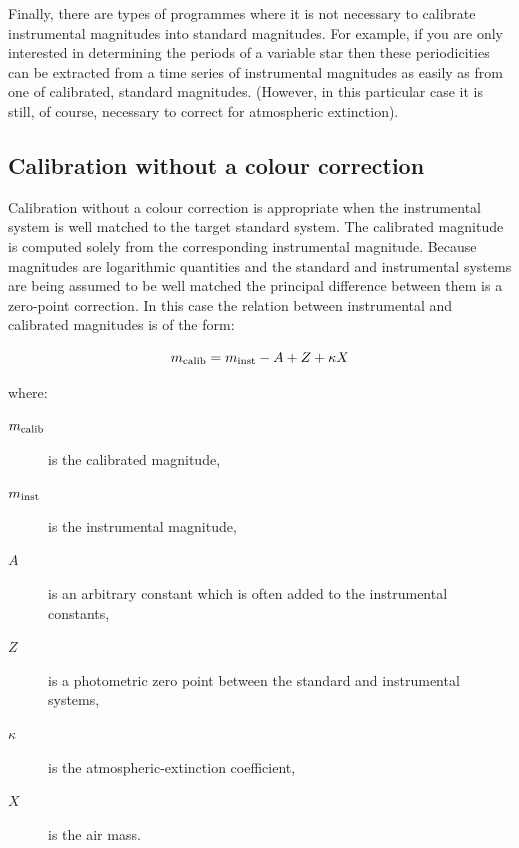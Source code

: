 \documentclass[twoside,11pt,nolof]{starlink}
\begin{document}
Finally, there are types of programmes where it is not necessary to
calibrate instrumental magnitudes into standard magnitudes.  For
example, if you are only interested in determining the periods of a
variable star then these periodicities can be extracted from a time
series of instrumental magnitudes as easily as from one of calibrated,
standard magnitudes.  (However, in this particular case it is still, of
course, necessary to correct for atmospheric extinction).

\subsection{Calibration without a colour correction}

Calibration without a colour correction is appropriate when the
instrumental system is well matched to the target standard system.  The
calibrated magnitude is computed solely from the corresponding
instrumental magnitude.  Because magnitudes are logarithmic quantities
and the standard and instrumental systems are being assumed to be well
matched the principal difference between them is a zero-point correction.
In this case the relation between instrumental and calibrated magnitudes
is of the form:

\begin{equation}
m_{\rm calib} = m_{\rm inst} - A + Z + \kappa X
\label{CALIBEQN}
\end{equation}

where:

\begin{description}

  \item[$m_{\rm calib}$] is the calibrated magnitude,

  \item[$m_{\rm inst}$] is the instrumental magnitude,

  \item[$A$] is an arbitrary constant which is often added to the
   instrumental constants,

  \item[$Z$] is a photometric zero point between the standard and
   instrumental systems,

  \item[$\kappa$] is the atmospheric-extinction coefficient,

  \item[$X$] is the air mass.

\end{description}
\end{document}
